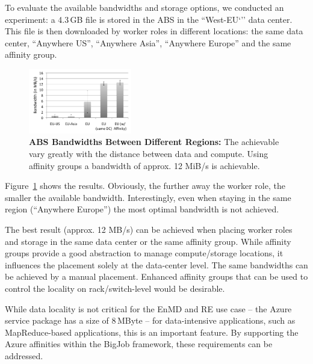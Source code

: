 \documentclass[conference,final]{IEEEtran}
\newcommand{\up}{\vspace*{-1em}}
\newcommand{\jhanote}[1]{ {\textcolor{red} { ***SJ: #1 }}}
\newcommand{\jhanote}[1]{}
\begin{document}
To evaluate the available bandwidths and storage options, we conducted
an experiment: a 4.3\,GB file is stored in the ABS in 
the ``West-EU`'' data center. This file is then
downloaded by worker roles in different locations: the same data center,
``Anywhere US'', ``Anywhere Asia'', ``Anywhere Europe'' and 
the same affinity group.

\begin{figure}[t]
    \centering
        \includegraphics[width=0.4\textwidth]{performance/azure-data-transfer.pdf}
          \caption{\textbf{ABS Bandwidths Between
            Different Regions:} The achievable vary greatly with the
          distance between data and compute. Using affinity groups a
          bandwidth of approx. 12 MiB/s is achievable.}
    \label{fig:performance_azure-data-transfer}
\end{figure}
Figure~\ref{fig:performance_azure-data-transfer} shows the results.
Obviously, the further away the worker role, the smaller the available
bandwidth. Interestingly, even when staying in the same region
(``Anywhere Europe'') the most optimal bandwidth is not achieved.

The best result (approx. 12 MB/s) %
can be achieved when placing worker roles and storage in the same data
center or the same affinity group. While affinity groups provide a
good abstraction to manage compute/storage locations, it influences
the placement solely at the data-center level. The same bandwidths can
be achieved by a manual placement. Enhanced affinity groups that can
be used to control the locality on rack/switch-level would be
desirable.


While data locality is not critical for the EnMD and RE use case --
the Azure service package has a size of 8\,MByte -- for data-intensive
applications, such as MapReduce-based applications, this is an
important feature. By supporting the Azure affinities within the
BigJob framework, these requirements can be addressed.  \up
\end{document}

